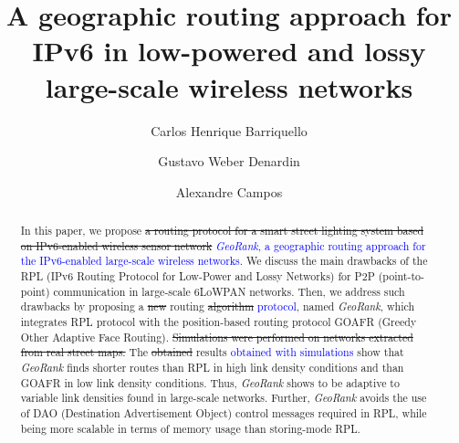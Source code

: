 \documentclass[final,authoryear,3p,twocolumn]{elsarticle}
\newcommand{\removed}{\sout}
\newcommand{\rev}{\textcolor{blue}}
\begin{document}
\begin{frontmatter}



\title{A geographic routing approach for IPv6 in low-powered and lossy large-scale wireless networks}



\author[addr1]{Carlos Henrique Barriquello}
\author[addr2]{Gustavo Weber Denardin}
\author[addr1]{Alexandre Campos}
\address[addr1]{Electronic Ballast Researching Group (GEDRE) - Intelligence in Lighting, Federal University of Santa Maria(UFSM), Santa Maria, RS, 97105-900, Brazil}
\address[addr2]{Technological Federal University of Paran$\acute{a}$, Pato Branco, PR, 85503-390, Brazil}


\begin{abstract}
In this paper, we propose \removed{a routing protocol for a smart street lighting system based on IPv6-enabled wireless sensor network} \rev{\textit{GeoRank}, a geographic routing approach for the IPv6-enabled large-scale  wireless networks}. We discuss the main drawbacks of the RPL (IPv6 Routing Protocol for
Low-Power and Lossy Networks) for P2P (point-to-point) communication in large-scale 6LoWPAN networks. Then, we address such drawbacks by proposing a \removed{new} routing \removed{algorithm} \rev{protocol}, named \textit{GeoRank}, which integrates RPL protocol with the position-based routing protocol GOAFR (Greedy Other Adaptive Face Routing). \removed{Simulations were performed on networks extracted from real street maps.} The \removed{obtained} results \rev{obtained with simulations} show that \textit{GeoRank} finds shorter routes than RPL in high link density conditions and than GOAFR in low link density conditions. Thus, \textit{GeoRank} shows to be adaptive to variable link densities found in large-scale networks. Further, \textit{GeoRank} avoids the use of DAO (Destination Advertisement Object) control messages required in RPL, while being more scalable in terms of memory usage than storing-mode RPL.
\end{abstract}



\end{frontmatter}
\end{document}
